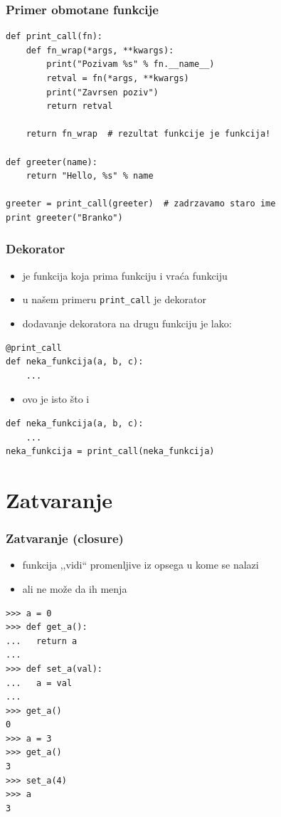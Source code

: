 \documentclass[compress]{beamer}
\begin{document}
\begin{frame}[fragile]
  \frametitle{Primer obmotane funkcije}
\begin{verbatim}
def print_call(fn):
    def fn_wrap(*args, **kwargs):
        print("Pozivam %s" % fn.__name__)
        retval = fn(*args, **kwargs) 
        print("Zavrsen poziv")
        return retval
    
    return fn_wrap  # rezultat funkcije je funkcija!

def greeter(name):
    return "Hello, %s" % name

greeter = print_call(greeter)  # zadrzavamo staro ime
print greeter("Branko")
\end{verbatim}
\end{frame}

\begin{frame}[fragile]
  \frametitle{Dekorator}
  \begin{itemize}
    \item {} je funkcija koja prima funkciju i vraća funkciju
    \item u našem primeru \texttt{print\_call} je dekorator
    \item dodavanje dekoratora na drugu funkciju je lako:
  \end{itemize}
\begin{verbatim}
@print_call
def neka_funkcija(a, b, c):
    ...
\end{verbatim}
  \begin{itemize}
    \item ovo je isto što i
  \end{itemize}
\begin{verbatim}
def neka_funkcija(a, b, c):
    ...
neka_funkcija = print_call(neka_funkcija)
\end{verbatim}
\end{frame}

\section[Closure]{Zatvaranje}

\begin{frame}[fragile,shrink=10]
  \frametitle{Zatvaranje (closure)}
  \begin{itemize}
    \item funkcija ,,vidi`` promenljive iz opsega u kome se nalazi
    \item ali ne može da ih menja
    \end{itemize}
\begin{verbatim}
>>> a = 0
>>> def get_a():
...   return a
...
>>> def set_a(val):
...   a = val
...
>>> get_a()
0
>>> a = 3
>>> get_a()
3
>>> set_a(4)
>>> a
3
\end{verbatim}
\end{frame}
\end{document}
